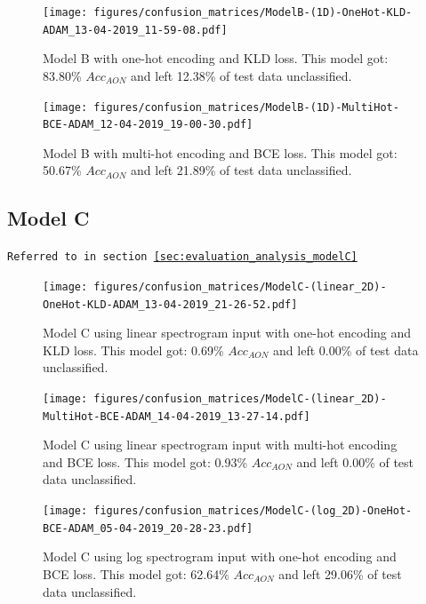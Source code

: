 \begin{appendices}
            \begin{figure}[H]
                \centering
                \texttt{[image: figures/confusion\_matrices/ModelB-(1D)-OneHot-KLD-ADAM\_13-04-2019\_11-59-08.pdf]}
                \caption*{Model B with one-hot encoding and KLD loss. This model got:  83.80\% $Acc_{AON}$ and left 12.38\% of test data unclassified.}
            \end{figure}
            
            \begin{figure}[H]
                \centering
                \texttt{[image: figures/confusion\_matrices/ModelB-(1D)-MultiHot-BCE-ADAM\_12-04-2019\_19-00-30.pdf]}
                \caption*{Model B with multi-hot encoding and BCE loss. This model got: 50.67\% $Acc_{AON}$ and left 21.89\% of test data unclassified.}
            \end{figure}
            
        \newpage
        \subsection{Model C}
        \label{app:modelC_confusion_matrix}
        \texttt{Referred to in section \ref{sec:evaluation_analysis_modelC}}
            \begin{figure}[H]
                \centering
                \texttt{[image: figures/confusion\_matrices/ModelC-(linear\_2D)-OneHot-KLD-ADAM\_13-04-2019\_21-26-52.pdf]}
                \caption*{Model C using linear spectrogram input with one-hot encoding and KLD loss. This model got:  0.69\% $Acc_{AON}$ and left 0.00\% of test data unclassified.}
            \end{figure}
            
            \begin{figure}[H]
                \centering
                \texttt{[image: figures/confusion\_matrices/ModelC-(linear\_2D)-MultiHot-BCE-ADAM\_14-04-2019\_13-27-14.pdf]}
                \caption*{Model C using linear spectrogram input with multi-hot encoding and BCE loss. This model got:  0.93\% $Acc_{AON}$ and left 0.00\% of test data unclassified.}
            \end{figure}
    
            \begin{figure}[H]
                \centering
                \texttt{[image: figures/confusion\_matrices/ModelC-(log\_2D)-OneHot-BCE-ADAM\_05-04-2019\_20-28-23.pdf]}
                \caption*{Model C using log spectrogram input with one-hot encoding and BCE loss. This model got: 62.64\% $Acc_{AON}$ and left 29.06\% of test data unclassified.}
            \end{figure}
            

\end{appendices}
